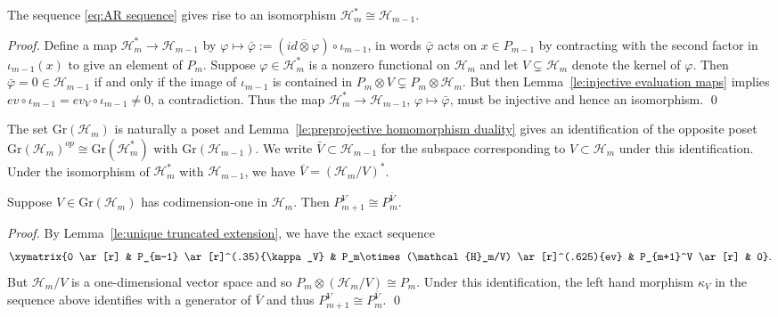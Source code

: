\documentclass[smallextended,envcountsect,envcountsame]{svjour3}
\numberwithin{equation}{section}
\newcommand{\cH}{\mathcal{H}}
\newcommand{\Gr}{\mathrm{Gr}}
\begin{document}
\begin{lemma}
  \label{le:preprojective homomorphism duality}
  The sequence \eqref{eq:AR sequence} gives rise to an isomorphism $\cH_m^*\cong \cH_{m-1}$.
\end{lemma}
\begin{proof}
  Define a map $\cH_m^*\to \cH_{m-1}$ by $\varphi\mapsto\bar{\varphi}:=(id\overline{\otimes}\varphi)\circ\iota_{m-1}$, in words $\bar{\varphi}$ acts on $x\in P_{m-1}$ by contracting with the second factor in $\iota_{m-1}(x)$ to give an element of $P_m$.
  Suppose $\varphi\in \cH_m^*$ is a nonzero functional on $\cH_m$ and let $V\subsetneq \cH_m$ denote the kernel of $\varphi$.
  Then $\bar{\varphi}=0\in \cH_{m-1}$ if and only if the image of $\iota_{m-1}$ is contained in $P_m\otimes V\subsetneq P_m\otimes \cH_m$.
  But then Lemma~\ref{le:injective evaluation maps} implies $ev\circ\iota_{m-1}=ev_V\circ\iota_{m-1}\ne0$, a contradiction.
  Thus the map $\cH_m^*\to \cH_{m-1}$, $\varphi\mapsto\bar{\varphi}$, must be injective and hence an isomorphism.
\qed\end{proof}
\begin{remark}
  The set $\Gr(\cH_m)$ is naturally a poset and Lemma~\ref{le:preprojective homomorphism duality} gives an identification of the opposite poset $\Gr(\cH_m)^{op}\cong \Gr(\cH_m^*)$ with $\Gr(\cH_{m-1})$.
  We write $\bar{V}\subset \cH_{m-1}$ for the subspace corresponding to $V\subset \cH_m$ under this identification.
  Under the isomorphism of $\cH_m^*$ with $\cH_{m-1}$, we have $\bar{V}=(\cH_m/V)^*$.
\end{remark}

\begin{corollary}
  \label{cor:truncated preprojective isomorphism}
  Suppose $V\in \Gr(\cH_m)$ has codimension-one in $\cH_m$.  Then $P_{m+1}^V\cong P_m^{\bar{V}}$.
\end{corollary}
\begin{proof}
  By Lemma~\ref{le:unique truncated extension}, we have the exact sequence
  \[\xymatrix{0 \ar[r] & P_{m-1} \ar[r]^(.35){\kappa_V} & P_m\otimes(\cH_m/V) \ar[r]^(.625){ev} & P_{m+1}^V \ar[r] & 0}.\]
  But $\cH_m/V$ is a one-dimensional vector space and so $P_m\otimes(\cH_m/V)\cong P_m$.
  Under this identification, the left hand morphism $\kappa_V$ in the sequence above identifies with a generator of $\bar{V}$ and thus $P_{m+1}^V\cong P_m^{\bar{V}}$.
\qed\end{proof}


\end{document}
